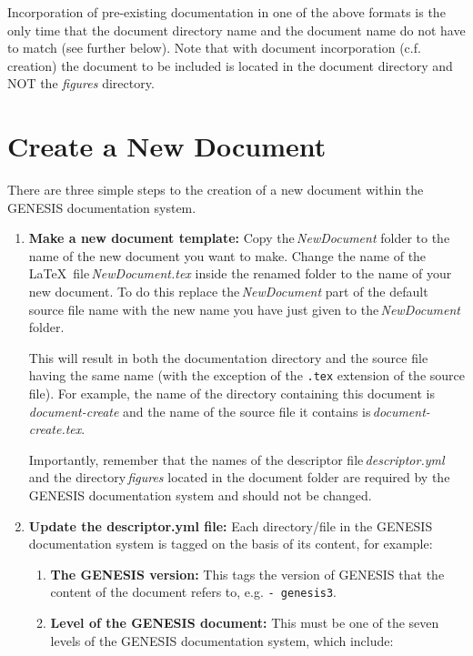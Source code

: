 \documentclass[12pt]{article}
\begin{document}
Incorporation of pre-existing documentation in one of the above formats is the only time that the document directory name and the document name do not have to match (see further below). Note that with document incorporation (c.f. creation) the document to be included is located in the document directory and NOT the {\it figures} directory.
 
\section*{Create a New Document}

There are three simple steps to the creation of a new document within the GENESIS documentation system.

\begin{enumerate}

\item {\bf Make a new document template:} Copy the\,{\it NewDocument} folder to the name of the new document you want to make. Change the name of the \LaTeX\,\,\,file\,{\it NewDocument.tex} inside the renamed folder to the name of your new document. To do this replace the\,{\it NewDocument} part of the default source file name with the new name you have just given to the\,{\it NewDocument} folder.

This will result in both the documentation directory and the source file having the same name (with the exception of the {\tt .tex} extension of the source file). For example, the name of the directory containing this document is {\it document-create} and the name of the source file it contains is\,{\it document-create.tex}.

Importantly, remember that the names of the descriptor file\,{\it descriptor.yml} and the directory\,{\it figures} located in the document folder are required by the GENESIS documentation system and should not be changed.

\item {\bf Update the descriptor.yml file:} Each directory/file in the GENESIS documentation system is tagged on the basis of its content, for example:

\begin{enumerate}

\item  {\bf The GENESIS version:} This tags the version of GENESIS that the content of the document refers to, e.g. {\tt -\,genesis3}.

\item {\bf Level of the GENESIS document:} This must be one of the seven levels of the GENESIS documentation system, which include:


\end{enumerate}
\end{enumerate}
\end{document}
